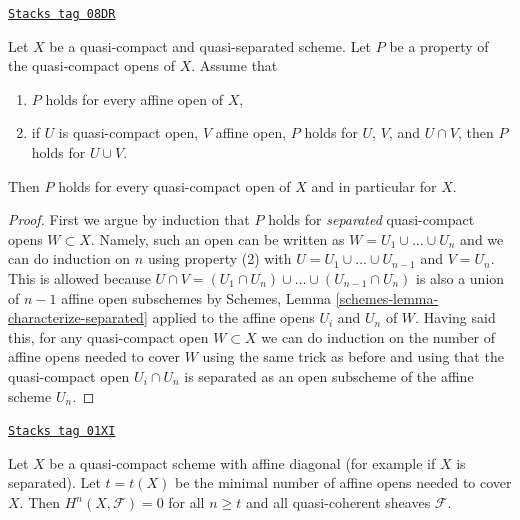 \begin{lemma}

\label{coherent-lemma-induction-principle}
\href{https://stacks.math.columbia.edu/tag/08DR}{\texttt{Stacks tag 08DR}}

\begin{reference}
\cite[Proposition 3.3.1]{BvdB}
\end{reference}
Let $X$ be a quasi-compact and quasi-separated scheme. Let $P$ be a property
of the quasi-compact opens of $X$. Assume that
\begin{enumerate}
\item $P$ holds for every affine open of $X$,
\item if $U$ is quasi-compact open, $V$ affine open,
$P$ holds for $U$, $V$, and $U \cap V$, then
$P$ holds for $U \cup V$.
\end{enumerate}
Then $P$ holds for every quasi-compact open of $X$
and in particular for $X$.
\end{lemma}

\begin{proof}
First we argue by induction that $P$ holds for {\it separated} quasi-compact
opens $W \subset X$. Namely, such an open can be written as
$W = U_1 \cup \ldots \cup U_n$ and we can do induction on $n$ using
property (2) with $U = U_1 \cup \ldots \cup U_{n - 1}$ and $V = U_n$.
This is allowed because
$U \cap V = (U_1 \cap U_n) \cup \ldots \cup (U_{n - 1} \cap U_n)$
is also a union of $n - 1$ affine open subschemes by
Schemes, Lemma \ref{schemes-lemma-characterize-separated}
applied to the affine opens $U_i$ and $U_n$ of $W$.
Having said this, for any quasi-compact open $W \subset X$ we can
do induction on the number of affine opens needed to cover $W$
using the same trick as before and using that the quasi-compact open
$U_i \cap U_n$ is separated as an open subscheme of the affine scheme $U_n$.
\end{proof}

\begin{lemma}
\label{coherent-lemma-vanishing-nr-affines}
\href{https://stacks.math.columbia.edu/tag/01XI}{\texttt{Stacks tag 01XI}}


Let $X$ be a quasi-compact scheme with affine diagonal (for example
if $X$ is separated).
Let $t = t(X)$ be the minimal number of affine opens needed to
cover $X$. Then $H^n(X, \mathcal{F}) = 0$ for all $n \geq t$ and all
quasi-coherent sheaves $\mathcal{F}$.
\end{lemma}


